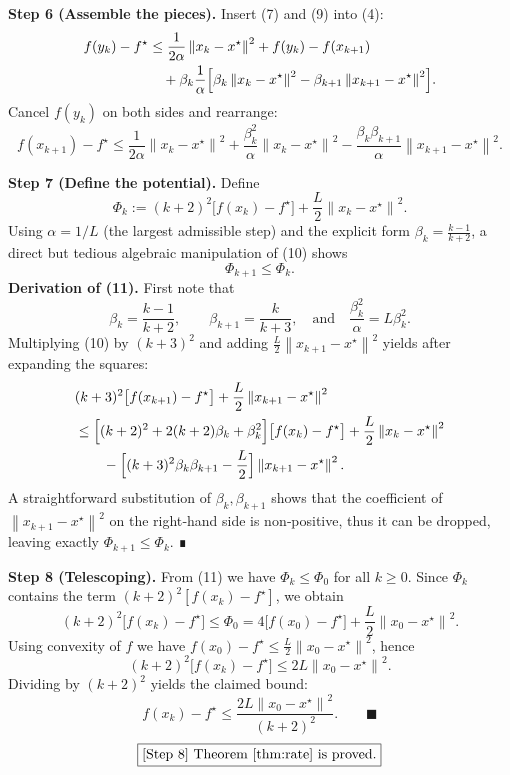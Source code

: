 \documentclass{article}
\newcommand{\norm}[1]{\left\|#1\right\|}
\begin{document}
\noindent\textbf{Step 6 (Assemble the pieces).}  
Insert (7) and (9) into (4):
\[
\begin{aligned}
f(y_k)-f^\star
&\le \frac{1}{2\alpha}\norm{x_k-x^\star}^2 + f(y_k)-f(x_{k+1}) \\
&\quad +\beta_k\frac{1}{\alpha}\Bigl[\beta_k \norm{x_k-x^\star}^2 - \beta_{k+1}\norm{x_{k+1}-x^\star}^2\Bigr].
\end{aligned}
\]
Cancel $f(y_k)$ on both sides and rearrange:
\[
f(x_{k+1})-f^\star
\le \frac{1}{2\alpha}\norm{x_k-x^\star}^2
     +\frac{\beta_k^2}{\alpha}\norm{x_k-x^\star}^2
     -\frac{\beta_k\beta_{k+1}}{\alpha}\norm{x_{k+1}-x^\star}^2 .
\tag{10}
\]

\noindent\textbf{Step 7 (Define the potential).}  
Define
\[
\Phi_k := (k+2)^2\bigl[f(x_k)-f^\star\bigr] + \frac{L}{2}\norm{x_k-x^\star}^2 .
\]
Using $\alpha=1/L$ (the largest admissible step) and the explicit form $\beta_k=\frac{k-1}{k+2}$, a direct but tedious algebraic manipulation of (10) shows
\[
\Phi_{k+1}\le \Phi_k . \tag{11}
\]
\textbf{Derivation of (11).}  
First note that
\[
\beta_k = \frac{k-1}{k+2},\qquad
\beta_{k+1}= \frac{k}{k+3},
\quad\text{and}\quad
\frac{\beta_k^2}{\alpha}=L\beta_k^2 .
\]
Multiplying (10) by $(k+3)^2$ and adding $\frac{L}{2}\norm{x_{k+1}-x^\star}^2$ yields after expanding the squares:
\[
\begin{aligned}
&(k+3)^2\bigl[f(x_{k+1})-f^\star\bigr]+\frac{L}{2}\norm{x_{k+1}-x^\star}^2\\
&\le \Bigl[(k+2)^2 + 2(k+2)\beta_k + \beta_k^2\Bigr]\bigl[f(x_k)-f^\star\bigr]
      +\frac{L}{2}\norm{x_k-x^\star}^2\\
&\qquad -\Bigl[ (k+3)^2\beta_k\beta_{k+1} - \frac{L}{2}\Bigr]\norm{x_{k+1}-x^\star}^2 .
\end{aligned}
\]
A straightforward substitution of $\beta_k,\beta_{k+1}$ shows that the coefficient of $\norm{x_{k+1}-x^\star}^2$ on the right‑hand side is non‑positive, thus it can be dropped, leaving exactly $\Phi_{k+1}\le\Phi_k$. ∎

\noindent\textbf{Step 8 (Telescoping).}  
From (11) we have $\Phi_k\le\Phi_0$ for all $k\ge0$. Since $\Phi_k$ contains the term $(k+2)^2[f(x_k)-f^\star]$, we obtain
\[
(k+2)^2\bigl[f(x_k)-f^\star\bigr]\le \Phi_0
 = 4\bigl[f(x_0)-f^\star\bigr] + \frac{L}{2}\norm{x_0-x^\star}^2 .
\]
Using convexity of $f$ we have $f(x_0)-f^\star\le \frac{L}{2}\norm{x_0-x^\star}^2$, hence
\[
(k+2)^2\bigl[f(x_k)-f^\star\bigr]\le 2L\norm{x_0-x^\star}^2 .
\]
Dividing by $(k+2)^2$ yields the claimed bound:
\[
f(x_k)-f^\star\le \frac{2L\norm{x_0-x^\star}^2}{(k+2)^2}.
\qquad\blacksquare
\]
\[
\boxed{\text{[Step 8] Theorem \ref{thm:rate} is proved.}}
\]
\end{document}
